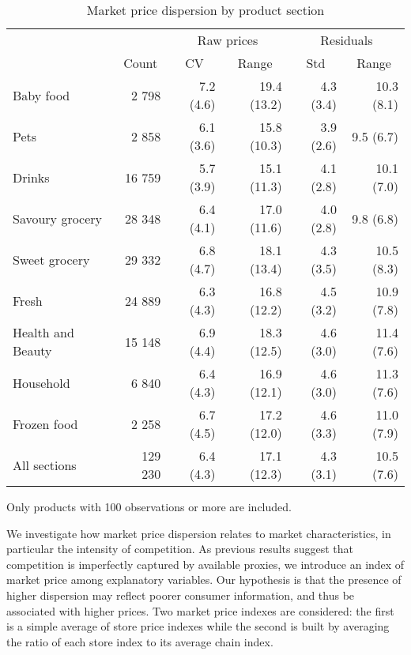 \documentclass[english]{article}
\begin{document}
\begin{table}
\caption{Market price dispersion by product section}
\label{tab:stats_market_dispersion}
\small
\begin{threeparttable}
\begin{tabular}{lrrrrr}
\toprule
      & \multicolumn{1}{c}{} & \multicolumn{2}{c}{Raw prices} & \multicolumn{2}{c}{Residuals} \\
      & \multicolumn{1}{c}{Count} & \multicolumn{1}{c}{CV} & \multicolumn{1}{c}{Range} & \multicolumn{1}{c}{Std} & \multicolumn{1}{c}{Range} \\
\midrule
Baby food & 2 798 & 7.2 (4.6) & 19.4 (13.2) & 4.3 (3.4) & 10.3 (8.1) \\
Pets  & 2 858 & 6.1 (3.6) & 15.8 (10.3) & 3.9 (2.6) & 9.5 (6.7) \\
Drinks & 16 759 & 5.7 (3.9) & 15.1 (11.3) & 4.1 (2.8) & 10.1 (7.0) \\
Savoury grocery & 28 348 & 6.4 (4.1) & 17.0 (11.6) & 4.0 (2.8) & 9.8 (6.8) \\
Sweet grocery & 29 332 & 6.8 (4.7) & 18.1 (13.4) & 4.3 (3.5) & 10.5 (8.3) \\
Fresh & 24 889 & 6.3 (4.3) & 16.8 (12.2) & 4.5 (3.2) & 10.9 (7.8) \\
Health and Beauty & 15 148 & 6.9 (4.4) & 18.3 (12.5) & 4.6 (3.0) & 11.4 (7.6) \\
Household & 6 840 & 6.4 (4.3) & 16.9 (12.1) & 4.6 (3.0) & 11.3 (7.6) \\
Frozen food & 2 258 & 6.7 (4.5) & 17.2 (12.0) & 4.6 (3.3) & 11.0 (7.9) \\
\midrule
All sections & 129 230 & 6.4 (4.3) & 17.1 (12.3) & 4.3 (3.1) & 10.5 (7.6) \\
\bottomrule
\bottomrule
\end{tabular}
\begin{tablenotes}
      \small
      \item Only products with 100 observations or more are included.
\end{tablenotes}
\end{threeparttable}
\end{table}

We investigate how market price dispersion relates to market characteristics, in particular the intensity of competition. As previous results suggest that competition is imperfectly captured by available proxies, we introduce an index of market price among explanatory variables. Our hypothesis is that the presence of higher dispersion may reflect poorer consumer information, and thus be associated with higher prices. Two market price indexes are considered: the first is a simple average of store price indexes while the second is built by averaging the ratio of each store index to its average chain index.
\end{document}
